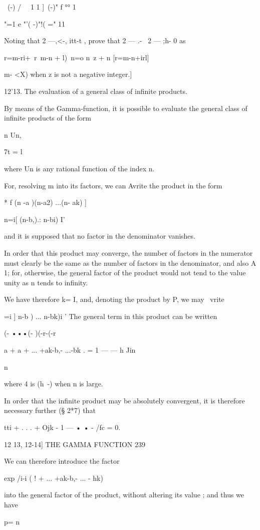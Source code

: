 \ (-) / \ \ 1 1 ]\ (-)" f °° 1

"=1 e "'( -)"!( =" 11

Noting that 2 —,<-, itt-t , prove that 2 — .- \ 2 — ;h- 0 as

r=m-ri+\ r\ m-n + l)\ n=o n\ z + n [r=m-n+irl]

m- <X) when z is not a negative integer.]

12'13. The evaluation of a general class of infinite products.

By means of the Gamma-function, it is possible to evaluate the general
class of infinite products of the form

n Un,

7t = l

where Un is any rational function of the index n.

For, resolving m into its factors, we can Avrite the product in the
form

* f (n -a )(n-a2) ...(n- ak) ]

n=i[ (n-b,).: n-bi) I'

and it is supposed that no factor in the denominator vanishes.

In order that this product may converge, the number of factors in the
numerator must clearly be the same as the number of factors in the
denominator, and also A 1; for, otherwise, the general factor of the
product would not tend to the value unity as n tends to infinity.

We have therefore k= I, and, denoting the product by P, we may \ vrite

 =i ] n-b ) ... n-bk)i ' The general term in this product can be
written

(- •••(- )(-r-(-r

a + a + ... +ak-b,- ...-bk . = 1 — — h Jin

n

where 4 is (h~-) when n is large.

In order that the infinite product may be absolutely convergent, it is
therefore necessary further (§ 2*7) that

tti + . . . + Ojk - 1 — • • - /fc = 0.

12 13, 12-14] THE GAMMA FUNCTION 239

We can therefore introduce the factor

exp /i-i ( ! + ... +ak-b,- ... - hk)

into the general factor of the product, without altering its value ;
and thus we have

p= n

